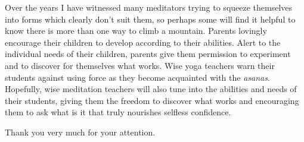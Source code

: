 Over the years I have witnessed many meditators trying to squeeze
themselves into forms which clearly don't suit them, so perhaps some
will find it helpful to know there is more than one way to climb a
mountain. Parents lovingly encourage their children to develop according
to their abilities. Alert to the individual needs of their children,
parents give them permission to experiment and to discover for
themselves what works. Wise yoga teachers warn their students against
using force as they become acquainted with the \emph{asanas}. Hopefully,
wise meditation teachers will also tune into the abilities and needs of
their students, giving them the freedom to discover what works and
encouraging them to ask what is it that truly nourishes selfless
confidence.

Thank you very much for your attention.

